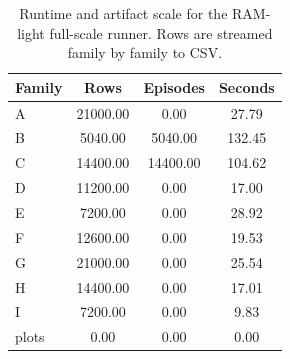 \begin{table}[t]
\centering
\small
\caption{Runtime and artifact scale for the RAM-light full-scale runner. Rows are streamed family by family to CSV.}
\label{tab:runtime}
\begin{tabular}{lccc}
\toprule
Family & Rows & Episodes & Seconds \\
\midrule
A & 21000.00 & 0.00 & 27.79 \\
B & 5040.00 & 5040.00 & 132.45 \\
C & 14400.00 & 14400.00 & 104.62 \\
D & 11200.00 & 0.00 & 17.00 \\
E & 7200.00 & 0.00 & 28.92 \\
F & 12600.00 & 0.00 & 19.53 \\
G & 21000.00 & 0.00 & 25.54 \\
H & 14400.00 & 0.00 & 17.01 \\
I & 7200.00 & 0.00 & 9.83 \\
plots & 0.00 & 0.00 & 0.00 \\
\bottomrule
\end{tabular}
\end{table}
